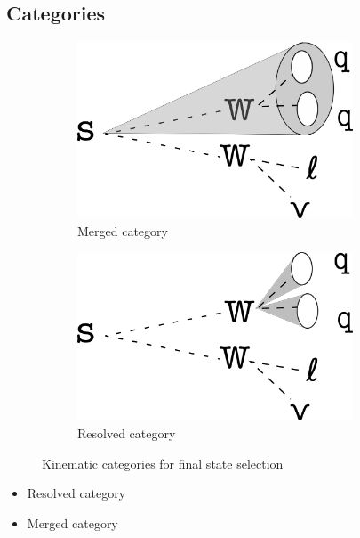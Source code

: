 \documentclass[12pt]{article}
\begin{document}
\subsection{Categories}
\begin{figure}[H]
     \centering
     \begin{subfigure}[b]{0.4\textwidth}
         \centering
         \includegraphics[width=0.9\textwidth]{figures/merged.png}
         \caption{Merged category}
         \label{fig:merged}
     \end{subfigure}
     \hfill
     \begin{subfigure}[b]{0.4\textwidth}
         \centering
         \includegraphics[width=0.9\textwidth]{figures/resolved.png}
         \caption{Resolved category}
         \label{fig:resolved}
     \end{subfigure}
\caption{Kinematic categories for final state selection}
\label{fig:categories}
\end{figure}
\begin{itemize}
\item Resolved category
\item Merged category
\end{itemize}
\end{document}
